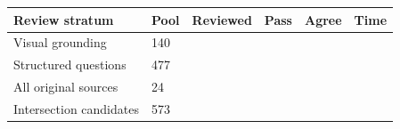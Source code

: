 \begin{tabularx}{\linewidth}{XXrrrr}
\toprule
Review stratum & Pool & Reviewed & Pass & Agree & Time\\\midrule
Visual grounding & 140 &  &  &  & \\
Structured questions & 477 &  &  &  & \\
All original sources & 24 &  &  &  & \\
Intersection candidates & 573 &  &  &  & \\
\bottomrule
\end{tabularx}
